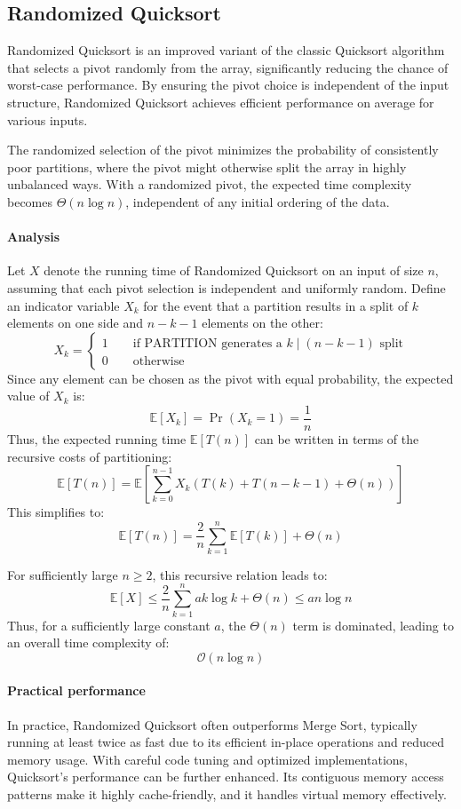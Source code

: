 \subsection{Randomized Quicksort}
Randomized Quicksort is an improved variant of the classic Quicksort algorithm that selects a pivot randomly from the array, significantly reducing the chance of worst-case performance.
By ensuring the pivot choice is independent of the input structure, Randomized Quicksort achieves efficient performance on average for various inputs.

The randomized selection of the pivot minimizes the probability of consistently poor partitions, where the pivot might otherwise split the array in highly unbalanced ways. 
With a randomized pivot, the expected time complexity becomes $\Theta(n \log n)$, independent of any initial ordering of the data.

\paragraph*{Analysis}
Let $X$ denote the running time of Randomized Quicksort on an input of size $n$, assuming that each pivot selection is independent and uniformly random. 
Define an indicator variable $X_k$ for the event that a partition results in a split of $k$ elements on one side and $n-k-1$ elements on the other:
\[X_k=\begin{cases}
    1 \qquad \text{if PARTITION generates a } k \mid (n-k-1) \text{ split} \\
    0 \qquad \text{otherwise}
\end{cases}\]
Since any element can be chosen as the pivot with equal probability, the expected value of $X_k$ is: 
\[\mathbb{E}[X_k] = \Pr(X_k = 1) = \dfrac{1}{n}\]
Thus, the expected running time $\mathbb{E}[T(n)]$ can be written in terms of the recursive costs of partitioning:
\[\mathbb{E}[T(n)] = \mathbb{E} \left[ \sum_{k=0}^{n-1} X_k \left( T(k) + T(n - k - 1) + \Theta(n) \right) \right]\]
This simplifies to:
\[\mathbb{E}[T(n)] =\frac{2}{n} \sum_{k=1}^{n} \mathbb{E}[T(k)] + \Theta(n)\]

For sufficiently large $n \geq 2$, this recursive relation leads to:
\[\mathbb{E}[X]\leq \frac{2}{n} \sum_{k=1}^{n} ak\log k + \Theta(n)\leq an\log n\]
Thus, for a sufficiently large constant $a$, the $\Theta(n)$ term is dominated, leading to an overall time complexity of:
\[\mathcal{O}(n\log n)\]

\paragraph*{Practical performance}
In practice, Randomized Quicksort often outperforms Merge Sort, typically running at least twice as fast due to its efficient in-place operations and reduced memory usage. 
With careful code tuning and optimized implementations, Quicksort's performance can be further enhanced. 
Its contiguous memory access patterns make it highly cache-friendly, and it handles virtual memory effectively.


